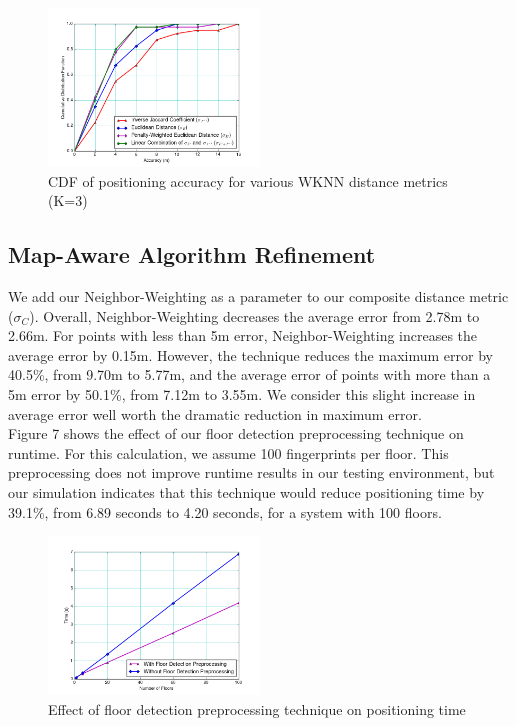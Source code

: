\documentclass[conference]{IEEEtran}
\begin{document}
\begin{figure}[h!]
  \centering
    \includegraphics[width=0.5\textwidth]{distance_comparison.png}
    \caption{CDF of positioning accuracy for various WKNN distance metrics (K=3)}
\end{figure}


\subsection{Map-Aware Algorithm Refinement}

We add our Neighbor-Weighting as a parameter to our composite distance metric ($\sigma_C$). Overall, Neighbor-Weighting decreases the average error from 2.78m to 2.66m. For points with less than 5m error, Neighbor-Weighting increases the average error by 0.15m. However, the technique reduces the maximum error by 40.5\%, from 9.70m to 5.77m, and the average error of points with more than a 5m error by 50.1\%, from 7.12m to 3.55m. We consider this slight increase in average error well worth the dramatic reduction in maximum error.\\		
\indent Figure 7 shows the effect of our floor detection preprocessing technique on runtime. For this calculation, we assume 100 fingerprints per floor. This preprocessing does not improve runtime results in our testing environment, but our simulation indicates that this technique would reduce positioning time by 39.1\%, from 6.89 seconds to 4.20 seconds, for a system with 100 floors.

\begin{figure}[h!]
  \centering
    \includegraphics[width=0.5\textwidth]{time_comparison.png}
   \caption{Effect of floor detection preprocessing technique on positioning time}
\end{figure}
\end{document}
